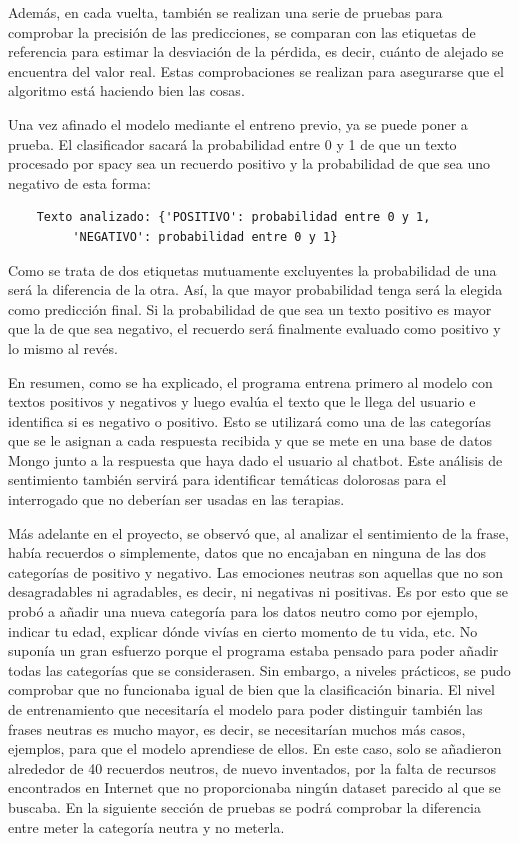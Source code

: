 Además, en cada vuelta, también se realizan una serie de pruebas para comprobar la precisión de las predicciones, se comparan con las etiquetas de referencia para estimar la desviación de la pérdida, es decir, cuánto de alejado se encuentra del valor real. Estas comprobaciones se realizan para asegurarse que el algoritmo está haciendo bien las cosas.

Una vez afinado el modelo mediante el entreno previo, ya se puede poner a prueba. El clasificador sacará la probabilidad entre 0 y 1 de que un texto procesado por spacy sea un recuerdo positivo y la probabilidad de que sea uno negativo de esta forma:

\begin{verbatim}
	Texto analizado: {'POSITIVO': probabilidad entre 0 y 1,
		 'NEGATIVO': probabilidad entre 0 y 1}
\end{verbatim}

Como se trata de dos etiquetas mutuamente excluyentes la probabilidad de una será la diferencia de la otra. Así, la que mayor probabilidad tenga será la elegida como predicción final. Si la probabilidad de que sea un texto positivo es mayor que la de que sea negativo, el recuerdo será finalmente evaluado como positivo y lo mismo al revés.

En resumen, como se ha explicado, el programa entrena primero al modelo con textos positivos y negativos y luego evalúa el texto que le llega del usuario e identifica si es negativo o positivo. Esto se utilizará como una de las categorías que se le asignan a cada respuesta recibida y que se mete en una base de datos Mongo junto a la respuesta que haya dado el usuario al chatbot. Este análisis de sentimiento también servirá para identificar temáticas dolorosas para el interrogado que no deberían ser usadas en las terapias.

Más adelante en el proyecto, se observó que, al analizar el sentimiento de la frase, había recuerdos o simplemente, datos que no encajaban en ninguna de las dos categorías de positivo y negativo. Las emociones neutras son aquellas que no son desagradables ni agradables, es decir, ni negativas ni positivas. Es por esto que se probó a añadir una nueva categoría para los datos neutro como por ejemplo, indicar tu edad, explicar dónde vivías en cierto momento de tu vida, etc. No suponía un gran esfuerzo porque el programa estaba pensado para poder añadir todas las categorías que se considerasen. Sin embargo, a niveles prácticos, se pudo comprobar que no funcionaba igual de bien que la clasificación binaria. El nivel de entrenamiento que necesitaría el modelo para poder distinguir también las frases neutras es mucho mayor, es decir, se necesitarían muchos más casos, ejemplos, para que el modelo aprendiese de ellos. En este caso, solo se añadieron alrededor de 40 recuerdos neutros, de nuevo inventados, por la falta de recursos encontrados en Internet que no proporcionaba ningún dataset parecido al que se buscaba. En la siguiente sección de pruebas se podrá comprobar la diferencia entre meter la categoría neutra y no meterla. 

